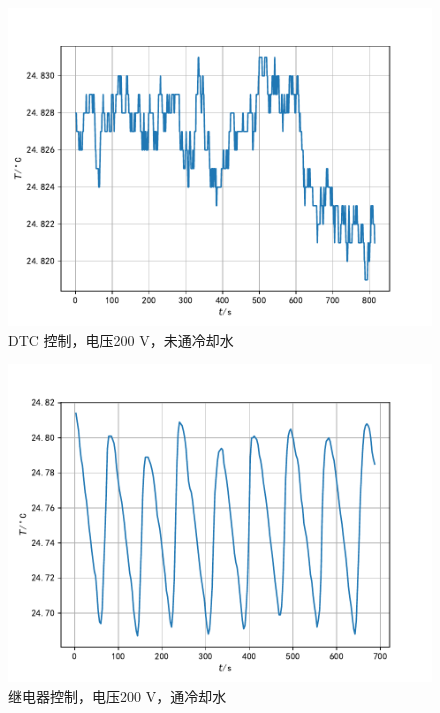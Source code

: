 \documentclass[12pt]{ctexart}
\numberwithin{equation}{section}
\begin{document}
\begin{figure}[!h]
    \centering
    \includegraphics[scale=0.68]{Figure_6.pdf}
    \caption{DTC 控制，电压200 V，未通冷却水}
\end{figure}

\begin{figure}[!h]
    \centering
    \includegraphics[scale=0.68]{Figure_7.pdf}
    \caption{继电器控制，电压200 V，通冷却水}
\end{figure}
\end{document}
